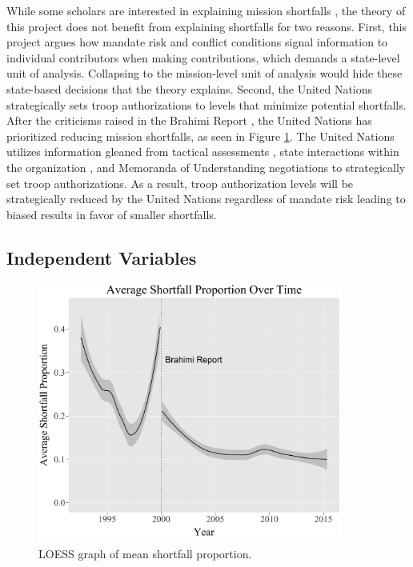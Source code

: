 \documentclass[12pt]{article}
\begin{document}
While some scholars are interested in explaining mission shortfalls \citep[Ex.][]{passmore2018}, the theory of this project does not benefit from explaining shortfalls for two reasons. First, this project argues how mandate risk and conflict conditions signal information to individual contributors when making contributions, which demands a state-level unit of analysis. Collapsing to the mission-level unit of analysis would hide these state-based decisions that the theory explains. Second, the United Nations strategically sets troop authorizations to levels that minimize potential shortfalls. After the criticisms raised in the Brahimi Report \citep{Brahimi}, the United Nations has prioritized reducing mission shortfalls, as seen in Figure \ref{fig:LOESS}. The United Nations utilizes information gleaned from tactical assessments \citep{OMA}, state interactions within the organization \citep{joshi2020}, and Memoranda of Understanding negotiations to strategically set troop authorizations. As a result, troop authorization levels will be strategically reduced by the United Nations regardless of mandate risk leading to biased results in favor of smaller shortfalls. 

\subsection*{Independent Variables}

\begin{figure}[t!]
\begin{centering}
\includegraphics[width=100mm]{gg_shortfall_learning.jpg}
\caption{LOESS graph of mean shortfall proportion.}
\label{fig:LOESS}
\end{centering}
\end{figure}
\end{document}
